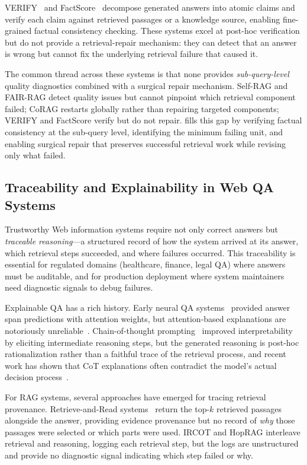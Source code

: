 VERIFY~\cite{verify2024} and FactScore~\cite{factscore2023} decompose generated
answers into atomic claims and verify each claim against retrieved passages or
a knowledge source, enabling fine-grained factual consistency checking. These
systems excel at post-hoc verification but do not provide a retrieval-repair
mechanism: they can detect that an answer is wrong but cannot fix the underlying
retrieval failure that caused it.

The common thread across these systems is that none provides \emph{sub-query-level}
quality diagnostics combined with a surgical repair mechanism. Self-RAG and
FAIR-RAG detect quality issues but cannot pinpoint which retrieval component
failed; CoRAG restarts globally rather than repairing targeted components;
VERIFY and FactScore verify but do not repair. \sys fills this gap by verifying
factual consistency at the sub-query level, identifying the minimum failing unit,
and enabling surgical repair that preserves successful retrieval work while
revising only what failed.

\subsection{Traceability and Explainability in Web QA Systems}

Trustworthy Web information systems require not only correct answers but
\emph{traceable reasoning}---a structured record of how the system arrived at
its answer, which retrieval steps succeeded, and where failures occurred. This
traceability is essential for regulated domains (healthcare, finance, legal QA)
where answers must be auditable, and for production deployment where system
maintainers need diagnostic signals to debug failures.

Explainable QA has a rich history. Early neural QA systems~\cite{rajpurkar2016squad}
provided answer span predictions with attention weights, but attention-based
explanations are notoriously unreliable~\cite{jain2019attention}. Chain-of-thought
prompting~\cite{wei2022cot} improved interpretability by eliciting intermediate
reasoning steps, but the generated reasoning is post-hoc rationalization rather
than a faithful trace of the retrieval process, and recent work has shown that
CoT explanations often contradict the model's actual decision
process~\cite{turpin2023cot}.

For RAG systems, several approaches have emerged for tracing retrieval provenance.
Retrieve-and-Read systems~\cite{karpukhin2020dpr} return the top-$k$ retrieved
passages alongside the answer, providing evidence provenance but no record of
\emph{why} those passages were selected or which parts were used. IRCOT and
HopRAG interleave retrieval and reasoning, logging each retrieval step, but the
logs are unstructured and provide no diagnostic signal indicating which step
failed or why.

